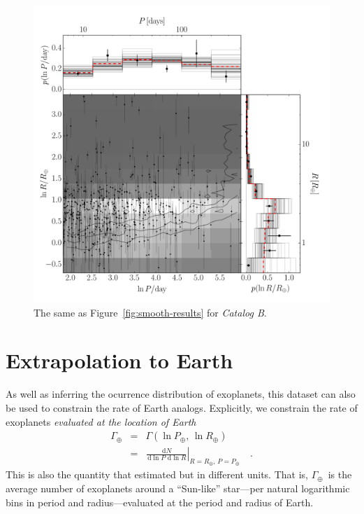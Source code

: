\documentclass[12pt,preprint]{aastex}
\newcommand{\Fig}[1]{Figure~\ref{fig:#1}}
\newcommand{\fig}[1]{\Fig{#1}}
\newcommand{\figlabel}[1]{\label{fig:#1}}
\newcommand{\dd}{\ensuremath{\,\mathrm{d}}}
\newcommand{\rate}{\ensuremath{\Gamma}}
\newcommand{\radius}{\ensuremath{R}}
\newcommand{\period}{\ensuremath{P}}
\newcommand{\modelb}{\emph{Catalog B}}
\newcommand{\gammaearth}{{\ensuremath{\rate_\oplus}}}
\begin{document}
\begin{figure}[p]
\begin{center}
\includegraphics[width=\textwidth]{figures/simulation/results.pdf}
\end{center}
\caption{%
The same as \fig{smooth-results} for \modelb.
\figlabel{simulation-results}}
\end{figure}

\section{Extrapolation to Earth}

As well as inferring the ocurrence distribution of exoplanets, this dataset
can also be used to constrain the rate of Earth analogs.
Explicitly, we constrain the rate of exoplanets \emph{evaluated at the
location of Earth}
\begin{eqnarray}
\gammaearth &=& \rate (\ln\period_\oplus,\,\ln\radius_\oplus) \\
&=&
\left.\frac{\dd N}{\dd\ln\period\,\dd\ln\radius}\right|
_{\radius=\radius_\oplus,\,\period=\period_\oplus}\quad.
\end{eqnarray}
This is also the quantity that \citet{petigura} estimated but in different
units.
That is, \gammaearth\ is the average number of exoplanets around a
``Sun-like'' star---per natural logarithmic bins in period and
radius---evaluated at the period and radius of Earth.
\end{document}
